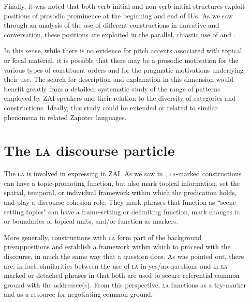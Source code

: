 Finally, it was noted that both verb-initial and non-verb-initial structures exploit positions of prosodic prominence at the beginning and end of IUs. As we saw through an analysis of the use of different  constructions in narrative and conversation, these positions are exploited in the parallel, chiastic use of  and . 

In this sense, while there is no evidence for pitch accents associated with topical or focal material, it is possible that there may be a prosodic motivation for the various types of constituent orders and for the pragmatic motivations underlying their use. The search for description and explanation in this dimension would benefit greatly from a detailed, systematic study of the range of  patterns employed by ZAI speakers and their relation to the diversity of  categories and constructions. Ideally, this study could be extended or related to similar phenomena in related Zapotec languages.



\section{The \textsc{la} discourse particle}

The  \textsc{la} is involved in expressing  in ZAI. As we saw in , \textsc{la}-marked constructions can have a topic-promoting function, but also mark topical information, set the spatial, temporal, or individual framework within which the predication holds, and play a discourse cohesion role. They mark phrases that function as ``scene-setting topics" can have a frame-setting or delimiting function, mark changes in  or boundaries of topical units, and/or function as  markers.

More generally, constructions with \textsc{la} form part of the background presuppositions and establish a framework within which to proceed with the discourse, in much the same way that a question does. As was pointed out, there are, in fact, similarities between the use of \textsc{la} in yes/no questions and in \textsc{la}-marked or detached phrases in that both are used to secure referential common ground with the addressee(s). From this perspective, \textsc{la} functions as a try-marker and as a resource for negotiating common ground. 

